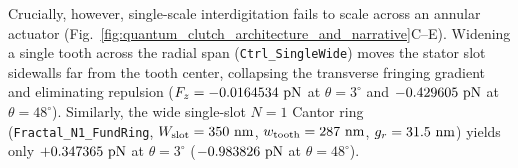 \documentclass[11pt,letterpaper]{article}
\begin{document}
Crucially, however, single-scale interdigitation fails to scale across an annular actuator (Fig.~\ref{fig:quantum_clutch_architecture_and_narrative}C--E). Widening a single tooth across the radial span (\texttt{Ctrl\_SingleWide}) moves the stator slot sidewalls far from the tooth center, collapsing the transverse fringing gradient and eliminating repulsion ($F_z = -0.0164534{}\text{ pN}$ at $\theta=3^\circ$ and $-0.429605{}\text{ pN}$ at $\theta=48^\circ$). Similarly, the wide single-slot $N=1$ Cantor ring (\texttt{Fractal\_N1\_FundRing}, $W_{\rm slot} = 350{}\text{ nm}$, $w_{\rm tooth} = 287{}\text{ nm}$, $g_r = 31.5{}\text{ nm}$) yields only $+0.347365{}\text{ pN}$ at $\theta=3^\circ$ ($-0.983826{}\text{ pN}$ at $\theta=48^\circ$).
\end{document}
